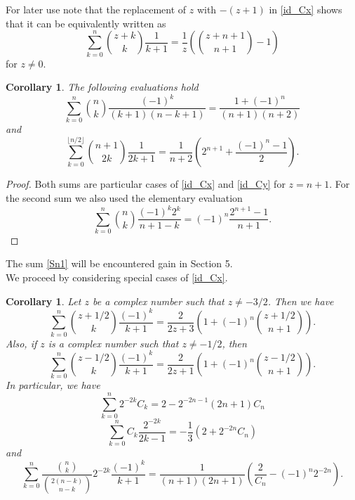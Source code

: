 \documentclass[10pt,a4paper]{amsart}
\numberwithin{equation}{section}
\newtheorem{corollary}[thm]{Corollary}
\begin{document}
For later use note that the replacement of $z$ with $-(z+1)$ in \eqref{id_Cx} shows that it can be equivalently written as 
\begin{equation}\label{eq_8}
\sum_{k=0}^n \binom{z+k}{k} \frac{1}{k+1} = \frac{1}{z} \left(\binom{z+n+1}{n+1} - 1 \right)
\end{equation}
for $z\neq 0$.

\begin{corollary}
The following evaluations hold
\begin{equation}\label{Sn1}
\sum_{k=0}^n \binom{n}{k} \frac{(-1)^k}{(k+1)(n-k+1)} = \frac{1+(-1)^n}{(n+1)(n+2)}
\end{equation}
and
\begin{equation}
\sum_{k=0}^{\lfloor{n/2}\rfloor} \binom{n+1}{2k} \frac{1}{2k+1} = \frac{1}{n+2}\left (2^{n+1} + \frac{(-1)^n-1}{2}\right ).
\end{equation}
\end{corollary} 
\begin{proof}
Both sums are particular cases of \eqref{id_Cx} and \eqref{id_Cy} for $z=n+1$. For the second sum we also used the elementary evaluation
$$\sum_{k=0}^n \binom{n}{k} \frac{(-1)^k 2^k}{n+1-k} = (-1)^n \frac{2^{n+1}-1}{n+1}.$$
\end{proof}

The sum \eqref{Sn1} will be encountered gain in Section 5.\\

We proceed by considering special cases of \eqref{id_Cx}.


\begin{corollary}
Let $z$ be a complex number such that $z\neq -3/2$. Then we have
\begin{equation}\label{from_Cx1}
\sum_{k=0}^n \binom{z+1/2}{k}\frac{(-1)^k}{k+1} = \frac{2}{2z+3}\left ( 1 + (-1)^n \binom{z+1/2}{n+1} \right ).
\end{equation}
Also, if $z$ is a complex number such that $z\neq -1/2$, then
\begin{equation}\label{from_Cx2}
\sum_{k=0}^n \binom{z-1/2}{k}\frac{(-1)^k}{k+1}= \frac{2}{2z+1}\left ( 1 + (-1)^n \binom{z-1/2}{n+1} \right ).
\end{equation}
In particular, we have
\begin{equation}
\sum_{k=0}^n 2^{-2k}C_k=2-2^{-2n-1}(2n+1)C_n
\end{equation}
\begin{equation}
\sum_{k=0}^n C_k \frac{2^{-2k}}{2k-1} = - \frac{1}{3}\left ( 2 + 2^{-2n} C_n \right )
\end{equation}
and
\begin{equation}
\sum_{k=0}^n \frac{\binom{n}{k}}{\binom{2(n-k)}{n-k}} 2^{-2k} \frac{(-1)^k}{k+1} = \frac{1}{(n+1)(2n+1)}\left ( \frac{2}{C_n} - (-1)^n 2^{-2n}\right ).
\end{equation}
\end{corollary}
\end{document}
